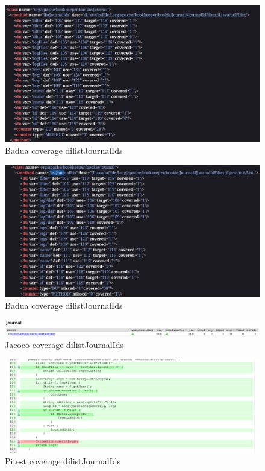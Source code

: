 \documentclass[10pt, a4paper]{article}
\begin{document}
  \begin{figure}
    \includegraphics[width=\linewidth]{./images/journal/BaduaCoveragelistJournalIds1.png}
    \caption{Badua coverage dilistJournalIds}
    \label{fig:listJournalIds_badua}
  \end{figure}

  \begin{figure}
    \includegraphics[width=\linewidth]{./images/journal/BaduaCoveragelistJournalIds2.png}
    \caption{Badua coverage dilistJournalIds}
    \label{fig:listJournalIds_badua2}
  \end{figure}

  \begin{figure}
    \includegraphics[width=\linewidth]{./images/journal/JacocoCoveragelistJournalIds3.png}
    \caption{Jacoco coverage dilistJournalIds}
    \label{fig:listJournalIds_jacoco4}
  \end{figure}

  \begin{figure}
    \includegraphics[width=\linewidth]{./images/journal/PitCoverageListJournalIds1.png}
    \caption{Pitest coverage dilistJournalIds}
    \label{fig:listJournalIds_pitest}
  \end{figure}
\end{document}
